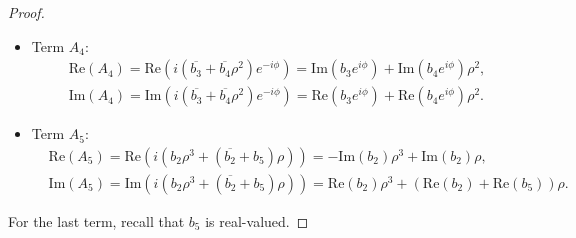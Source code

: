 \documentclass[10pt,a4paper]{amsart}
\newcommand{\im}[1]{\mathrm{Im} \left(#1\right)}
\newcommand{\re}[1]{\mathrm{Re}\left(#1\right)}
\begin{document}
\begin{proof}
\begin{itemize}
        \item Term $A_4$:
        \begin{equation*}
        \begin{aligned}
        &\re{A_4} = \re{i (\overline{b_3} + \overline{b_4} \rho^2) e^{-i\phi}} = \im{b_3 e^{i\phi}} + \im{b_4 e^{i\phi}} \rho^2,\\[5pt]
        &\im{A_4} = \im{i (\overline{b_3} + \overline{b_4} \rho^2) e^{-i\phi}} = \re{b_3 e^{i\phi}} + \re{b_4 e^{i\phi}} \rho^2 .
        \end{aligned}
        \end{equation*}
    
        \item Term $A_5$:
        \begin{equation*}
        \begin{aligned}
        &\re{A_5} = \re{i \left( b_2 \rho^3 + (\overline{b_2} + b_5) \rho \right)} = -\im{b_2} \rho^3 + \im{b_2} \rho,\\[5pt]
        &\im{A_5} = \im{i \left( b_2 \rho^3 + (\overline{b_2} + b_5) \rho \right)} = \re{b_2} \rho^3 +  (\re{b_2} + \re{b_5}) \rho .
        \end{aligned}
        \end{equation*}
    \end{itemize}
    For the last term, recall that $b_5$ is real-valued.
    

\end{proof}
\end{document}
